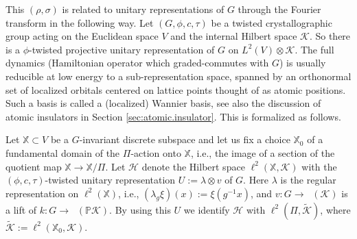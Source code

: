 \documentclass[11pt]{amsart}
\theoremstyle{definition}
\theoremstyle{plain}
\theoremstyle{remark}
\newcommand{\bP}{\mathbb{P}}
\newcommand{\bX}{\mathbb{X}}
\newcommand{\sH}{\mathscr{H}}
\newcommand{\sK}{\mathscr{K}}
\DeclareMathOperator{\qAut}{\mathrm{Aut}_{\mathrm{qtm}}}
\begin{document}
This $(\rho,\sigma)$ is related to unitary representations of $G$ through the Fourier transform in the following way. 
Let $(G,\phi,c,\tau)$ be a twisted crystallographic group acting on the Euclidean space $V$ and the internal Hilbert space $\sK$. So there is a $\phi$-twisted projective unitary representation of $G$ on $L^2(V)\otimes\sK$. The full dynamics (Hamiltonian operator which graded-commutes with $G$) is usually reducible at low energy to a sub-representation space, spanned by an orthonormal set of localized orbitals centered on lattice points thought of as atomic positions. Such a basis is called a (localized) Wannier basis, see also the discussion of atomic insulators in Section \ref{sec:atomic.insulator}. This is formalized as follows. 


Let $\bX \subset V$ be a $G$-invariant discrete subspace and let us fix a choice $\bX_0$ of a fundamental domain of the $\Pi$-action onto $\bX$, i.e., the image of a section of the quotient map $\bX \to \bX/\Pi$. Let $\sH$ denote the Hilbert space $\ell^2(\bX, \sK)$ with the $(\phi,c,\tau)$-twisted unitary representation $U:=\lambda \otimes v$ of $G$. Here $\lambda $ is the regular representation on $\ell^2(\bX)$, i.e., $(\lambda_g\xi)(x) :=\xi (g^{-1}x)$, and $v \colon G \to \qAut(\sK)$ is a lift of $k \colon G \to \qAut(\bP\sK)$. 
By using this $U$ we identify $\sH$ with $\ell^2(\Pi,\tilde{\sK})$, where $\tilde{\sK}
:=\ell^2(\bX_0,\sK)$. 
\end{document}
